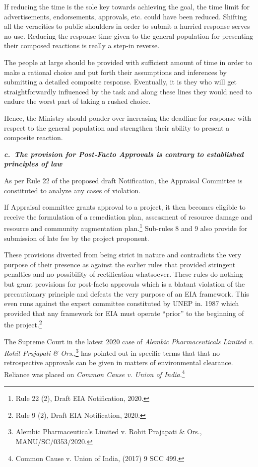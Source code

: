 \begin{multicols}{2}
\noi
If reducing the time is the sole key towards achieving the goal, the time limit for
advertisements, endorsements, approvals, etc. could have been reduced. Shifting all the
veracities to public shoulders in order to submit a hurried response serves no use.
Reducing the response time given to the general population for presenting their composed
reactions is really a step-in reverse. 

\noi
The people at large should be provided with sufficient amount of time in order to make a
rational choice and put forth their assumptions and inferences by submitting a detailed
composite response. Eventually, it is they who will get straightforwardly influenced by the
task and along these lines they would need to endure the worst part of taking a rushed choice. 

\noi
Hence, the Ministry should ponder over increasing the deadline for response with respect to
the general population and strengthen their ability to present a composite reaction. 

\noi
{\large\it\bfseries c.~The provision for Post-Facto Approvals is contrary to established principles of law}

\noi
As per Rule 22 of the proposed draft Notification, the Appraisal Committee is constituted to
analyze any cases of violation. 

\noi
If Appraisal committee grants approval to a project, it then becomes eligible to receive the
formulation of a remediation plan, assessment of resource damage and resource and
community augmentation plan.\footnote{Rule 22 (2), Draft EIA Notification, 2020.} Sub-rules 8 and 9 also provide for submission of late fee by
the project proponent.

\noi
These provisions diverted from being strict in nature and contradicts the very purpose of their
presence as against the earlier rules that provided stringent penalties and no possibility of
rectification whatsoever. These rules do nothing but grant provisions for post-facto approvals
which is a blatant violation of the precautionary principle and defeats the very purpose of an
EIA framework. This even runs against the expert committee constituted by UNEP in. 1987
which provided that any framework for EIA must operate “prior” to the beginning of the
project.\footnote{Rule 9 (2), Draft EIA Notification, 2020.}

\noi
The Supreme Court in the latest 2020 case of \textit{Alembic Pharmaceuticals Limited v. Rohit
Prajapati \& Ors}.,\footnote{Alembic Pharmaceuticals Limited v. Rohit Prajapati \& Ors., MANU/SC/0353/2020.} has pointed out in specific terms that that no retrospective approvals can
be given in matters of environmental clearance. Reliance was placed on \textit{Common Cause v.
Union of India}.\footnote{Common Cause v. Union of India, (2017) 9 SCC 499.} 


\end{multicols}
